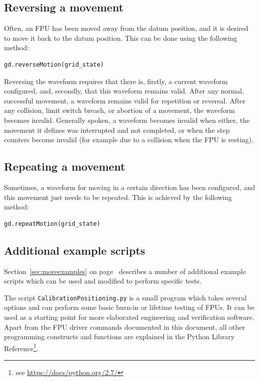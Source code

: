 \documentclass[11pt,a4paper]{scrartcl}
\begin{document}
\subsection{Reversing a movement}
Often, an FPU has been moved away from the datum position, and it is
desired to move it back to the datum position.  This can be done using
the following method:

\begin{verbatim}
gd.reverseMotion(grid_state)
\end{verbatim}

Reversing the waveform requires that there is, firstly, a current
waveform configured, and, secondly, that this waveform remains valid.
After any normal, successful movement, a waveform remains valid for
repetition or reversal. After any collision, limit switch breach, or
abortion of a movement, the waveform becomes invalid. Generally
spoken, a waveform becomes invalid when either, the movement it
defines was interrupted and not completed, or when the step counters
become invalid (for example due to a collision when the FPU is
resting).


\subsection{Repeating a movement}
Sometimes, a waveform for moving in a certain direction has been
configured, and this movement just needs to be repeated.  This is
achieved by the following method:

\begin{verbatim}
gd.repeatMotion(grid_state)
\end{verbatim}

\subsection{Additional example scripts}

Section~\ref{sec:moreexamples} on page~\pageref{sec:moreexamples}
describes a number of additional example scripts which can be used and
modified to perform specific tests.

The script \texttt{CalibrationPositioning.py} is a small program which
takes several options and can perform some basic burn-in or lifetime
testing of FPUs. It can be used as a starting point for more
elaborated engineering and verification software. Apart from the FPU
driver commands documented in this document, all other programming
constructs and functions are explained in the Python Library
Reference\footnote{see \url{https://docs/python.org/2.7/}}.
\end{document}
